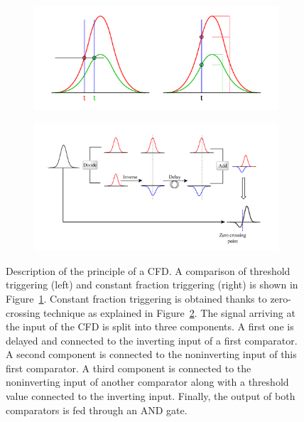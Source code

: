 	\begin{figure}[H]
		\begin{subfigure}{\linewidth}
			\centering
			\includegraphics[width = 0.7\plotwidth]{fig/chapt4/CFD_1.pdf}\\
			\caption{\label{fig:CFD:A}}
		\end{subfigure}
		\begin{subfigure}{\linewidth}
		    \centering
			\includegraphics[width = 0.84\plotwidth]{fig/chapt4/CFD_2.png}
			\caption{\label{fig:CFD:B}}
		\end{subfigure}
		\caption{\label{fig:CFD} Description of the principle of a CFD. A comparison of threshold triggering (left) and constant fraction triggering (right) is shown in Figure~\ref{fig:CFD:A}. Constant fraction triggering is obtained thanks to zero-crossing technique as explained in Figure~\ref{fig:CFD:B}. The signal arriving at the input of the CFD is split into three components. A first one is delayed and connected to the inverting input of a first comparator. A second component is connected to the noninverting input of this first comparator. A third component is connected to the noninverting input of another comparator along with a threshold value connected to the inverting input. Finally, the output of both comparators is fed through an AND gate.}
	\end{figure}
	
